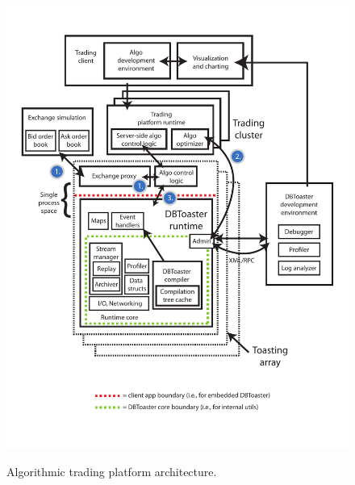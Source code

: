 \begin{figure}
\includegraphics[scale=0.38]{figures/finapp}
\label{fig:algarch}
\caption{Algorithmic trading platform architecture.}
\end{figure}
